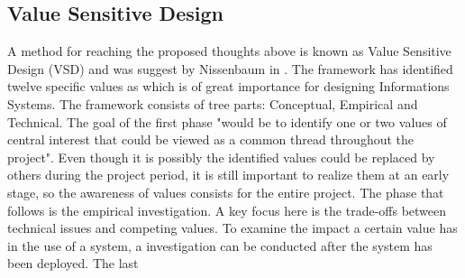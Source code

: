 \subsection{Value Sensitive Design}
A method for reaching the proposed thoughts above is known as Value Sensitive Design (VSD) and was suggest by Nissenbaum in . The framework has identified twelve specific values as which is of great importance for designing Informations Systems. The framework consists of tree parts: Conceptual, Empirical and Technical. The goal of the first phase "would be to identify one or two values of central interest that could be viewed as a common thread throughout the project". Even though it is possibly the identified values could be replaced by others during the project period, it is still important to realize them at an early stage, so the awareness of values consists for the entire project. 
The phase that follows is the empirical investigation. A key focus here is the trade-offs between technical issues and competing values. To examine the impact a certain value has in the use of a system, a investigation can be conducted after the system has been deployed. 
The last  
